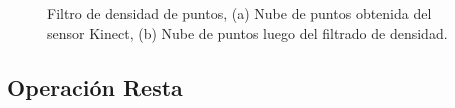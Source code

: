         
        
        
        \begin{figure}[!htb] 
        	\centering
        	\caption[Filtro de densidad de puntos.]{Filtro de densidad de puntos, (a) Nube de puntos obtenida del sensor Kinect, (b) Nube de puntos luego del filtrado de densidad.} 
        	\label{fig:FiltroDensidad}
        \end{figure}
        
        
%        
    \subsection{Operación Resta}
    
